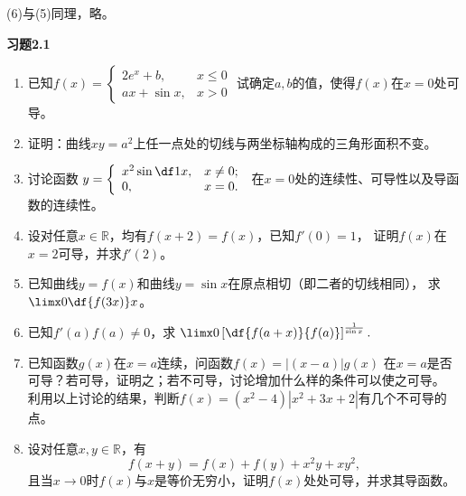 (6)与(5)同理，略。
\fin

\begin{ext}
	{\centering\bf 习题2.1}
	
	\begin{enumerate}  
	  \item 已知$f(x)=\left\{\begin{array}{ll}
		2e^x+b,& x\leq0\\ ax+\sin x,& x> 0
		\end{array}\right.$
		试确定$a,b$的值，使得$f(x)$在$x=0$处可导。
	  \item 证明：曲线$xy=a^2$上任一点处的切线与两坐标轴构成的三角形面积不变。
	  \item 讨论函数
	  	$y=\left\{\begin{array}{ll}
	    	x^2\sin\df1x,& x\ne0;\\ 0, & x=0.
	    \end{array}\right.$
	  在$x=0$处的连续性、可导性以及导函数的连续性。
	  \item 设对任意$x\in\mathbb{R}$，均有$f(x+2)=f(x)$，已知$f'(0)=1$，
	  证明$f(x)$在$x=2$可导，并求$f'(2)$。
	  \item 已知曲线$y=f(x)$和曲线$y=\sin x$在原点相切（即二者的切线相同），
	  求$\limx0\df{f(3x)}x$。
	  \item 已知$f'(a)f(a)\ne 0$，求
	  $\limx0\left[\df{f(a+x)}{f(a)}\right]^{\frac1{\sin x}}.$
	  \item 已知函数$g(x)$在$x=a$连续，问函数$f(x)=|(x-a)|g(x)$
	  在$x=a$是否可导？若可导，证明之；若不可导，讨论增加什么样的条件可以使之可导。
	  利用以上讨论的结果，判断$f(x)=(x^2-4)|x^2+3x+2|$有几个不可导的点。
	  \item 设对任意$x,y\in\mathbb{R}$，有
	  $$f(x+y)=f(x)+f(y)+x^2y+xy^2,$$
	  且当$x\to0$时$f(x)$与$x$是等价无穷小，证明$f(x)$处处可导，并求其导函数。
	\end{enumerate}
\end{ext}

